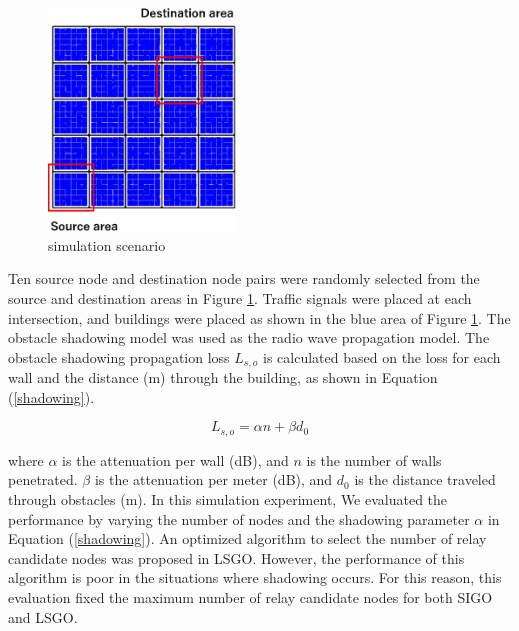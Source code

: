 \documentclass[conference]{IEEEtran}
\begin{document}
\begin{figure}[!ht]
\centering
\includegraphics[width=50mm]{figures/scenario.eps}
\caption{simulation scenario }
\label{fig:scenario}
\end{figure}


Ten source node and destination node pairs were randomly selected from the source and destination areas in Figure \ref{fig:scenario}.
 Traffic signals were placed at each intersection, and buildings were placed as shown in the blue area of Figure \ref{fig:scenario}. 
The obstacle shadowing model \cite{20} was used as the radio wave propagation model. The obstacle shadowing propagation loss $L_{s,o}$ is calculated based on the loss for each wall and the distance (m) through the building, as shown in Equation (\ref{shadowing}).

\begin{equation}
\label{shadowing}
L_{s,o} = \alpha n  + \beta d_0
\end{equation}

where $\alpha$ is the attenuation per wall (dB), and $n$ is the number of walls penetrated. 
$\beta$ is the attenuation per meter (dB), and $d_0$ is the distance traveled through obstacles (m). 
In this simulation experiment, We evaluated the performance by varying the number of nodes and the shadowing parameter $\alpha$ in Equation (\ref{shadowing}).
An optimized algorithm to select the number of relay candidate nodes was proposed in LSGO. However, the performance of this algorithm is poor in the situations where shadowing occurs. For this reason, this evaluation fixed the maximum number of relay candidate nodes for both SIGO and LSGO.
\end{document}
